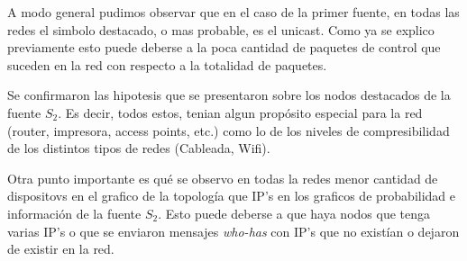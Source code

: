 A modo general pudimos observar que en el caso
de la primer fuente, en todas las redes el 
simbolo destacado, o mas probable, es el unicast.
Como ya se explico previamente esto puede deberse
a la poca cantidad de paquetes de control que suceden
en la red con respecto a la totalidad de paquetes.


Se confirmaron las hipotesis que se presentaron sobre los nodos destacados de
la fuente $S_2$. Es decir, todos estos, tenian algun propósito especial para la
red (router, impresora, access points, etc.) como lo de los niveles
de compresibilidad de los distintos tipos de redes (Cableada, Wifi).


Otra punto importante es qué se observo en todas la redes
menor cantidad de dispositovs en el grafico de la topología
que IP's en los graficos de probabilidad e información de la fuente $S_2$.
Esto puede deberse a que haya nodos que tenga varias IP's
o que se enviaron mensajes \textit{who-has} con IP's que no existían o dejaron
de existir en la red.
